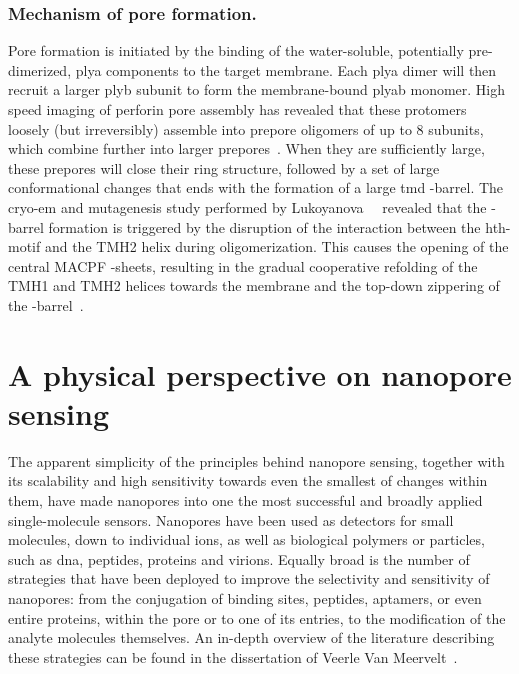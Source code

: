 \subsubsection{Mechanism of pore formation.}
%

Pore formation is initiated by the binding of the water-soluble, potentially pre-dimerized, \gls{plya}
components to the target membrane. Each \gls{plya} dimer will then recruit a larger \gls{plyb} subunit to form
the membrane-bound \gls{plyab} monomer. High speed imaging of perforin pore assembly has revealed that these
protomers loosely (but irreversibly) assemble into prepore oligomers of up to 8 subunits, which combine
further into larger prepores~\cite{Leung-2017}. When they are sufficiently large, these prepores will close
their ring structure, followed by a set of large conformational changes that ends with the formation of a
large \gls{tmd} \tb-barrel. The \gls{cryo-em} and mutagenesis study performed by
Lukoyanova~\etal{}~\cite{Lukoyanova-Kondos-2015} revealed that the \tb-barrel formation is triggered by the
disruption of the interaction between the \gls{hth}-motif and the {TMH2} helix during oligomerization. This
causes the opening of the central {MACPF} \tb-sheets, resulting in the gradual cooperative refolding of the
{TMH1} and {TMH2} helices towards the membrane and the top-down zippering of the
\tb-barrel~\cite{Reboul-2016}.


%
\clearpage
%

%
%
\section{A physical perspective on nanopore sensing}
%
\label{sec:np:physical_perspective}
%

The apparent simplicity of the principles behind nanopore sensing, together with its scalability and high
sensitivity towards even the smallest of changes within them, have made nanopores into one the most successful
and broadly applied single-molecule sensors. Nanopores have been used as detectors for small molecules, down
to individual ions, as well as biological polymers or particles, such as \gls{dna}, peptides, proteins and
virions. Equally broad is the number of strategies that have been deployed to improve the selectivity and
sensitivity of nanopores: from the conjugation of binding sites, peptides, aptamers, or even entire proteins,
within the pore or to one of its entries, to the modification of the analyte molecules themselves. An in-depth
overview of the literature describing these strategies can be found in the dissertation of Veerle Van
Meervelt~\cite{VanMeervelt-2017-PhD}.

